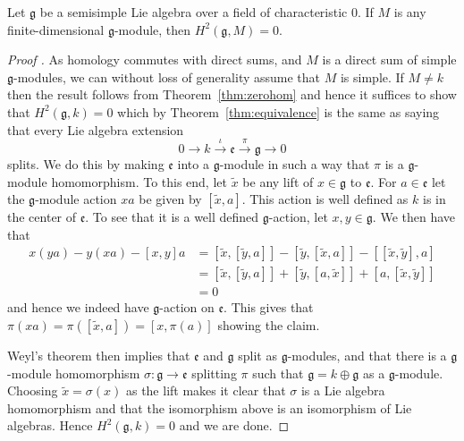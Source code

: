 \begin{corollary}
  Let $ \mathfrak{g} $ be a semisimple Lie algebra over a field of characteristic 0. If $ M $ is any finite-dimensional $ \mathfrak{g} $-module, then $ H^2(\mathfrak{g}, M)=0 $.
\end{corollary}
\begin{proof}[Proof \cite{weibel1994homological}]
  As homology commutes with direct sums, and $ M $ is a direct sum of simple $ \mathfrak{g} $-modules, we can without loss of generality assume that $ M $ is simple. If $ M \neq k $ then the result follows from Theorem~\ref{thm:zerohom} and hence it suffices to show that $ H^2(\mathfrak{g}, k) = 0 $ which by Theorem~\ref{thm:equivalence} is the same as saying that every Lie algebra extension
  \begin{equation}
    0 \to k \xrightarrow{\iota} \mathfrak{e} \xrightarrow{\pi} \mathfrak{g} \to 0
  \end{equation}
  splits. We do this by making $ \mathfrak{e} $ into a $ \mathfrak{g} $-module in such a way that $ \pi $ is a $ \mathfrak{g} $-module homomorphism. To this end, let $ \tilde{x} $ be any lift of $ x \in \mathfrak{g} $ to $ \mathfrak{e} $. For $ a \in \mathfrak{e} $ let the $ \mathfrak{g} $-module action $ xa $ be given by $ [\tilde{x}, a] $. This action is well defined as $ k $ is in the center of $ \mathfrak{e} $. To see that it is a well defined $ \mathfrak{g} $-action, let $ x,y \in \mathfrak{g} $. We then have that
  \begin{align*}
    x(ya) - y(xa) - [x, y]a &= [\tilde{x}, [\tilde{y}, a]] - [\tilde{y}, [\tilde{x}, a]] - [[\tilde{x},\tilde{y}], a] \\
                            &= [\tilde{x}, [\tilde{y}, a]] + [\tilde{y}, [a, \tilde{x}]] + [a, [\tilde{x},\tilde{y}]] \\
                            &= 0
  \end{align*}
  and hence we indeed have $ \mathfrak{g} $-action on $ \mathfrak{e} $. This gives that $ \pi(xa) = \pi([\tilde{x}, a])=[x, \pi(a)] $ showing the claim.

  Weyl's theorem then implies that $ \mathfrak{e} $ and $ \mathfrak{g} $ split as $ \mathfrak{g} $-modules, and that there is a $ \mathfrak{g} $-module homomorphism $ \sigma: \mathfrak{g} \to \mathfrak{e} $ splitting $ \pi $ such that $ \mathfrak{g} = k \oplus \mathfrak{g} $ as a $ \mathfrak{g} $-module. Choosing $ \tilde{x}=\sigma(x) $ as the lift makes it clear that $ \sigma $ is a Lie algebra homomorphism and that the isomorphism above is an isomorphism of Lie algebras. Hence $ H^2(\mathfrak{g}, k)=0 $ and we are done.
\end{proof}

